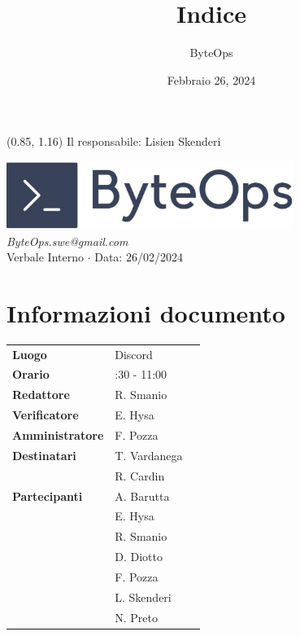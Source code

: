 \documentclass{article}
\title{\textbf{\fontsize{28}{6}\selectfont Indice}}
\author{\fontsize{14}{6}\selectfont ByteOps}
\date{Febbraio 26, 2024}
\begin{document}
\begin{textblock*}{\textwidth}(0.85\textwidth, 1.16\textheight)
    Il responsabile: Lisien Skenderi
\end{textblock*}

\pagestyle{fancy}
\begin{center}
\includegraphics[width = 0.7\textwidth]{../../Images/logo.png} \\
\vspace{0.2cm}
\textcolor[RGB]{60, 60, 60}{\textit{ByteOps.swe@gmail.com}} \\
\vspace{1cm}
\fontsize{16}{6}\selectfont Verbale Interno $\cdot$ Data: 26/02/2024 \\
\vspace{0.5cm}
\end{center}

\section*{Informazioni documento}
\def\arraystretch{1.2}
\begin{tabular}{>{\raggedleft\arraybackslash}p{}|>{\raggedright\arraybackslash}p{}c}
\hline
\addlinespace
\textbf{Luogo} & Discord \vspace{10pt} \\
\textbf{Orario} & 09:30 - 11:00 \vspace{10pt} \\
\textbf{Redattore} & R. Smanio \vspace{10pt} \\
\textbf{Verificatore} & E. Hysa \vspace{10pt} \\
\textbf{Amministratore} & F. Pozza \vspace{10pt} \\
\textbf{Destinatari} & T. Vardanega \\ & R. Cardin \vspace{10pt} \\
\textbf{Partecipanti} & A. Barutta \\ & E. Hysa \\ & R. Smanio \\ & D. Diotto \\ & F. Pozza \\ & L. Skenderi \\ & N. Preto \vspace{10pt} \\
\end{tabular}
\pagebreak 
\end{document}
